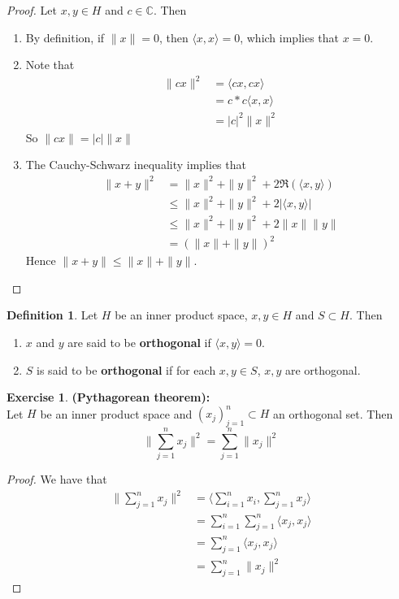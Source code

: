 \documentclass[12pt]{amsart}
\theoremstyle{definition}
\newtheorem{defn}[definition]{Definition}
\newtheorem{ex}[definition]{Exercise}
\newcommand{\C}{\mathbb{C}}
\renewcommand{\r}{\rangle}
\renewcommand{\l}{\langle}
\newcommand{\lex}[1]{\label{ex:#1}}
\newcommand{\ld}[1]{\label{defn:#1}}
\begin{document}
\begin{proof}Let $x,y \in H$ and $c \in \C$. Then
\begin{enumerate}
\item By definition, if $\|x\| = 0$, then $\l x, x \r =0$, which implies that $x =0$.
\item Note that 
\begin{align*}
\| cx \|^2 
&= \l cx, cx \r \\
&= c*c \l x, x\r \\
&= |c|^2\| x \|^2
\end{align*}
So $\| cx \| = |c|\|x\|$
\item The Cauchy-Schwarz inequality implies that
\begin{align*}
\|x + y\|^2 
&= \|x\|^2 + \|y\|^2 + 2 \Re(\l x, y\r) \\
& \leq \|x\|^2 + \|y\|^2 + 2 |\l x, y\r | \\
& \leq \|x\|^2 + \|y\|^2 + 2 \|x\| \|y\| \\
&= (\|x\| + \|y\|)^2
\end{align*}
Hence $\|x + y\| \leq \|x\| + \|y\|$.
\end{enumerate}
\end{proof}

\begin{defn} \ld{}
	Let $H$ be an inner product space, $x, y \in H$ and $S \subset H$. Then
	\begin{enumerate}
	\item $x$ and $y$ are said to be \textbf{orthogonal} if $\l x,y\r = 0$. 
	\item $S$ is said to be \textbf{orthogonal} if for each $x,y \in S$, $x,y$ are orthogonal. 
	\end{enumerate}
\end{defn}

\begin{ex} \lex{}\textbf{(Pythagorean theorem):}\\
	Let $H$ be an inner product space and $(x_j)_{j =1}^n \subset H$ an orthogonal set. Then $$\bigg \|\sum\limits_{j = 1}^n x_j  \bigg \|^2 = \sum\limits_{j =1}^n \|x_j \|^2$$
\end{ex}

\begin{proof}
	We have that
	\begin{align*}
		\bigg \| \sum\limits_{j = 1}^n  x_j\bigg \|^2
		&= \bigg \l \sum\limits_{i =1}^n x_i , \sum\limits_{j =1}^n x_j \bigg \r \\
		&= \sum\limits_{i =1}^n \sum\limits_{j =1}^n \l x_j , x_j \r \\
		&= \sum\limits_{j =1}^n \l x_j , x_j \r \\
		&= \sum\limits_{j =1}^n \| x_j \|^2
	\end{align*}
\end{proof}
\end{document}

